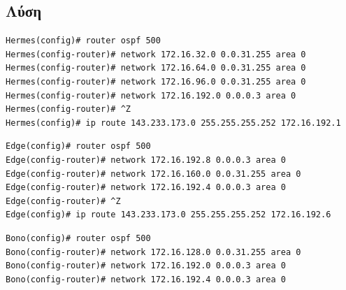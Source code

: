 \documentclass{assignment}
\begin{document}
\subsection{Λύση}

\begin{verbatim}
Hermes(config)# router ospf 500
Hermes(config-router)# network 172.16.32.0 0.0.31.255 area 0
Hermes(config-router)# network 172.16.64.0 0.0.31.255 area 0
Hermes(config-router)# network 172.16.96.0 0.0.31.255 area 0
Hermes(config-router)# network 172.16.192.0 0.0.0.3 area 0
Hermes(config-router)# ^Z
Hermes(config)# ip route 143.233.173.0 255.255.255.252 172.16.192.1
\end{verbatim}

\begin{verbatim}
Edge(config)# router ospf 500
Edge(config-router)# network 172.16.192.8 0.0.0.3 area 0
Edge(config-router)# network 172.16.160.0 0.0.31.255 area 0
Edge(config-router)# network 172.16.192.4 0.0.0.3 area 0
Edge(config-router)# ^Z
Edge(config)# ip route 143.233.173.0 255.255.255.252 172.16.192.6
\end{verbatim}

\begin{verbatim}
Bono(config)# router ospf 500
Bono(config-router)# network 172.16.128.0 0.0.31.255 area 0
Bono(config-router)# network 172.16.192.0 0.0.0.3 area 0
Bono(config-router)# network 172.16.192.4 0.0.0.3 area 0
\end{verbatim}

 \label{Βιβλιογραφία}



\newpage
\end{document}
